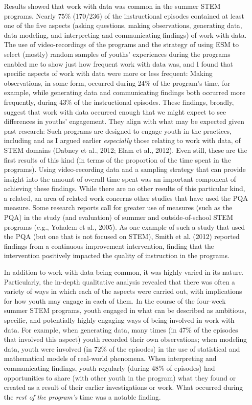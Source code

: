 \documentclass[]{msu-thesis}
\theoremstyle{definition}
\theoremstyle{definition}
\theoremstyle{definition}
\theoremstyle{remark}
\begin{document}
Results showed that work with data was common in the summer STEM
programs. Nearly 75\% (170/236) of the instructional episodes contained
at least one of the five aspects (asking questions, making observations,
generating data, data modeling, and interpreting and communicating
findings) of work with data. The use of video-recordings of the programs
and the strategy of using ESM to select (mostly) random samples of
youths' experiences during the programs enabled me to show just how
frequent work with data was, and I found that specific aspects of work
with data were more or less frequent: Making observations, in some form,
occurred during 24\% of the program's time, for example, while
generating data and communicating findings both occurred more
frequently, during 43\% of the instructional episodes. These findings,
broadly, suggest that work with data occurred enough that we might
expect to see differences in youths' engagement. They align with what
may be expected given past research: Such programs are designed to
engage youth in the practices, including and as I argued earlier
\emph{especially} those relating to work with data, of STEM domains
(Dabney et al., 2012; Elam et al., 2012). Even still, these are the
first results of this kind (in terms of the proportion of the time spent
in the programs). Using video-recording data and a sampling strategy
that can provide insight into the amount of overall time spent was an
important component of achieving these findings. While there are no
other results of this particular kind, a related, an area of related
work concerns other studies that have used the PQA measure. Some
research reports call for greater use of measures (such as the PQA) in
the study (and evaluation) of summer and outside-of-school STEM programs
(e.g., Yohalem et al., 2005). As one example of such a study that used
the PQA (but one that is not focused on STEM), Smith et al. (2012)
reported findings from a continuous improvement intervention, finding
that the intervention positively impacted the quality of instruction in
the programs.

In addition to work with data being common, it was highly varied in its
nature. Particularly, the in-depth qualitative analysis revealed that
there was often a variety of ways in which each of the aspects were
carried out, with implications for how youth may engage in each of them.
In the course of the four-week summer STEM programs, youth engaged in
what can be described as ambitious, specific, and potentially highly
engaging ways of being involved in work with data. For example, when
generating data, many times (in 47\% of the episodes that involved this
aspect) youth recorded their own observations; when modeling data, youth
were involved (in 72\% of the episodes) in the use of statistical and
mathematical models of real-world phenomena. When interpreting and
communicating findings, youth regularly (during 48\% of episodes) had
opportunities to share (with other youth in the program) what they found
or created as a result of their earlier investigations or work. What
occurred during the \emph{rest of the program's} time was a notable
finding.
\end{document}
